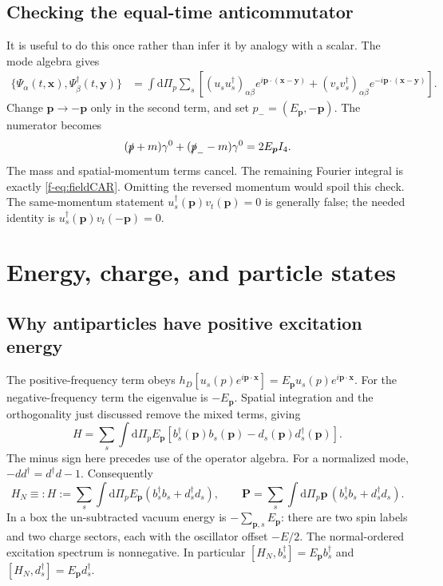 \documentclass[11pt]{article}
\newcommand{\dd}{\mathrm{d}}
\begin{document}
\subsection{Checking the equal-time anticommutator}
It is useful to do this once rather than infer it by analogy with a scalar.
The mode algebra gives
\begin{align}
 \{\Psi_\alpha(t,\bm x),\Psi_\beta^\dagger(t,\bm y)\}
 &=\int\dd\Pi_p\sum_s\left[
 (u_su_s^\dagger)_{\alpha\beta}e^{i\bm p\cdot(\bm x-\bm y)}
 +(v_sv_s^\dagger)_{\alpha\beta}e^{-i\bm p\cdot(\bm x-\bm y)}\right].
 \label{f-eq:CARcheck}
\end{align}
Change \(\bm p\to-\bm p\) only in the second term, and set
\(p_-=(E_{\bm p},-\bm p)\). The numerator becomes
\begin{equation}
 (\slashed p+m)\gamma^0+(\slashed p_- -m)\gamma^0=2E_{\bm p}I_4.
 \label{f-eq:completeness}
\end{equation}
The mass and spatial-momentum terms cancel. The remaining Fourier
integral is exactly \eqref{f-eq:fieldCAR}. Omitting the reversed momentum
would spoil this check. The same-momentum statement
\(u_s^\dagger(\bm p)v_t(\bm p)=0\) is generally false; the needed identity is
\(u_s^\dagger(\bm p)v_t(-\bm p)=0\).

\section{Energy, charge, and particle states}
\subsection{Why antiparticles have positive excitation energy}
The positive-frequency term obeys
\(h_D[u_s(p)e^{i\bm p\cdot\bm x}]=E_{\bm p}u_s(p)e^{i\bm p\cdot\bm x}\).
For the negative-frequency term the eigenvalue is \(-E_{\bm p}\).
Spatial integration and the orthogonality just discussed remove the
mixed terms, giving
\begin{equation}
 H=\sum_s\int\dd\Pi_p E_{\bm p}
 [b_s^\dagger(\bm p)b_s(\bm p)-d_s(\bm p)d_s^\dagger(\bm p)].
 \label{f-eq:unordH}
\end{equation}
The minus sign here precedes use of the operator algebra. For a normalized
mode, \(-dd^\dagger=d^\dagger d-1\). Consequently
\begin{equation}
 H_N\equiv:H:=\sum_s\int\dd\Pi_p E_{\bm p}(b_s^\dagger b_s+d_s^\dagger d_s),
 \qquad \bm P=\sum_s\int\dd\Pi_p\bm p\,(b_s^\dagger b_s+d_s^\dagger d_s).
 \label{f-eq:normalH}
\end{equation}
In a box the un-subtracted vacuum energy is
\(-\sum_{\bm p,s}E_{\bm p}\): there are two spin labels and two charge
sectors, each with the oscillator offset \(-E/2\).
The normal-ordered excitation spectrum is nonnegative.
In particular \([H_N,b_s^\dagger]=E_{\bm p}b_s^\dagger\) and
\([H_N,d_s^\dagger]=E_{\bm p}d_s^\dagger\).
\end{document}
